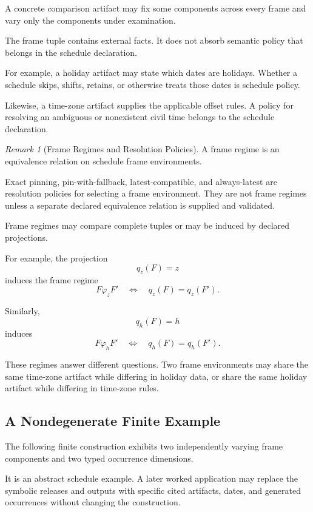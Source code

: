 \documentclass[11pt]{article}
\theoremstyle{plain}
\theoremstyle{definition}
\theoremstyle{remark}
\newtheorem{remark}[theorem]{Remark}
\begin{document}
A concrete comparison artifact may fix
some components across every frame
and vary only the components under examination.

The frame tuple contains external facts.
It does not absorb semantic policy
that belongs in the schedule declaration.

For example,
a holiday artifact may state
which dates are holidays.
Whether a schedule skips,
shifts,
retains,
or otherwise treats those dates
is schedule policy.

Likewise,
a time-zone artifact supplies
the applicable offset rules.
A policy for resolving an ambiguous
or nonexistent civil time
belongs to the schedule declaration.

\begin{remark}[Frame Regimes and Resolution Policies]
  \label{ik.rem.schedule-frame-policy}
  A frame regime is an equivalence relation
  on schedule frame environments.

  Exact pinning,
  pin-with-fallback,
  latest-compatible,
  and always-latest are resolution policies
  for selecting a frame environment.
  They are not frame regimes
  unless a separate declared equivalence relation
  is supplied and validated.
\end{remark}

Frame regimes may compare complete tuples
or may be induced by declared projections.

For example,
the projection
\[
  q_z(F)
  =
  z
\]
induces the frame regime
\[
  F
  \mathrel{\varphi_z}
  F'
  \quad\Longleftrightarrow\quad
  q_z(F)=q_z(F').
\]

Similarly,
\[
  q_h(F)
  =
  h
\]
induces
\[
  F
  \mathrel{\varphi_h}
  F'
  \quad\Longleftrightarrow\quad
  q_h(F)=q_h(F').
\]

These regimes answer different questions.
Two frame environments may share
the same time-zone artifact
while differing in holiday data,
or share the same holiday artifact
while differing in time-zone rules.

\subsection{A Nondegenerate Finite Example}

The following finite construction
exhibits two independently varying frame components
and two typed occurrence dimensions.

It is an abstract schedule example.
A later worked application may replace
the symbolic releases and outputs
with specific cited artifacts,
dates,
and generated occurrences
without changing the construction.
\end{document}
